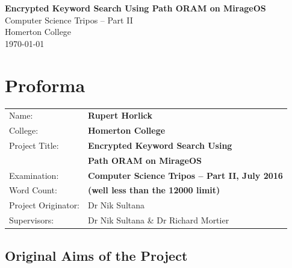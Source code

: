 \documentclass[12pt,a4paper,twoside,openright]{report}
\begin{document}




\pagestyle{empty}


\vspace*{60mm}
\begin{center}
\Huge
\textbf{Encrypted Keyword Search Using Path ORAM on MirageOS} \\[5mm]
Computer Science Tripos -- Part II \\[5mm]
Homerton College \\[5mm]
\today  %
\end{center}


\pagestyle{plain}

\chapter*{Proforma}

{\large
\begin{tabular}{ll}
Name:               & \bf Rupert Horlick                       \\
College:            & \bf Homerton College                     \\
Project Title:      & \bf Encrypted Keyword Search Using \\
& \bf Path ORAM on MirageOS \\
Examination:        & \bf Computer Science Tripos -- Part II, July 2016  \\
Word Count:         & \bf \footnotemark[1]
                      (well less than the 12000 limit)  \\
Project Originator: & Dr Nik Sultana                    \\
Supervisors:         & Dr Nik Sultana \& Dr Richard Mortier                    \\
\end{tabular}
}


\section*{Original Aims of the Project}
\end{document}
